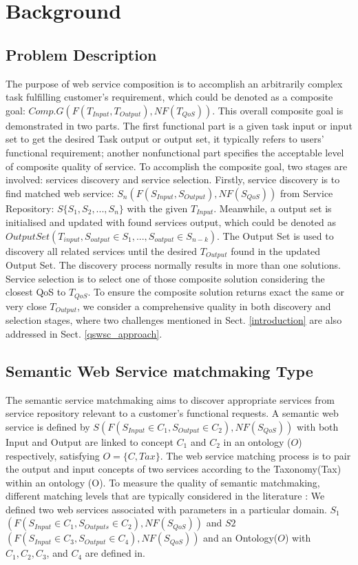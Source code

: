 \documentclass{llncs}
\begin{document}
\section{Background}\label{background}

\subsection{Problem Description}\label{problemDes}

The purpose of web service composition is to accomplish an arbitrarily complex task fulfilling customer's requirement, which could be denoted as a composite goal: $Comp.G(F(T_{Input}, T_{Output}), NF(T_{QoS}))$. This overall composite goal is demonstrated in two parts. The first functional part is a given task input or input set to get the desired Task output or output set, it typically refers to users' functional requirement; another nonfunctional part specifies the acceptable level of composite quality of service. To accomplish the composite goal, two stages are involved: services discovery and service selection. Firstly, service discovery is to find matched web service: $S_{n}(F(S_{Input}, S_{Output}), NF(S_{QoS}))$ from Service Repository: $S \{S_{1}, S_{2},..., S_{n} \}$ with the given $T_{Input}$. Meanwhile, a output set is initialised and updated with found services output, which could be denoted as  $Output Set(T_{input}, S_{output} \in S_1,...,S_{output} \in S_{n-k})$. The Output Set is used to discovery all related services until the desired $T_{Output}$ found in the updated Output Set. The discovery process normally results in more than one solutions. Service selection is to select one of those composite solution considering the closest QoS to $T_{QoS}$. To ensure the composite solution returns exact the same or very close $T_{Output}$, we consider a comprehensive quality in both discovery and selection stages, where two challenges mentioned in Sect. \ref{introduction} are also addressed in Sect. \ref{qswsc_approach}.

\subsection{Semantic Web Service matchmaking Type}\label{semantic Web service Discovery}
The semantic service matchmaking aims to discover appropriate services from service repository relevant to a customer's functional requests. A semantic web service is defined by $S(F(S_{Input}\in C_{1}, S_{Output}\in C_{2}), NF(S_{QoS}))$ with both Input and Output are linked to concept $C_{1}$ and $C_{2}$ in an ontology ($O$) respectively, satisfying $O=\{C, Tax\}$. The web service matching process is to pair the output and input concepts of two services according to the Taxonomy(Tax) within an ontology (O). To measure the quality of semantic matchmaking, different matching levels that are typically considered in the literature \cite{paolucci2002semantic}: We defined two web services associated with parameters in a particular domain. $S_{1}$ $(F(S_{Input}\in C_{1}, S_{Outputs}\in C_{2}), NF(S_{QoS}))$ and  $S2$ $(F(S_{Input}\in C_{3}, S_{Output}\in C_{4}), NF(S_{QoS}))$ and an Ontology($O$) with $C_{1},C_{2},C_{3}$, and $C_{4}$ are defined in. 
\end{document}
